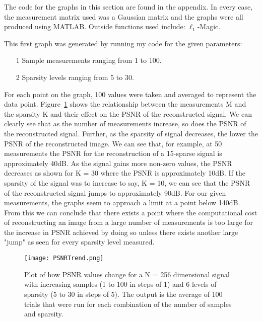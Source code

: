 \documentclass[titlepage,oneside, 12pt]{book}
\theoremstyle{break}
\begin{document}
The code for the graphs in this section are found in the appendix. In every case, the measurement matrix used was a Gaussian matrix and the graphs were all produced using MATLAB. Outside functions used include: $\ell_1$-Magic\cite{L1Magic}. 

This first graph was generated by running my code for the given parameters:

\begin{itemize}
\item[1] Sample measurements ranging from 1 to 100.
\item[2] Sparsity levels ranging from 5 to 30. 
\end{itemize}

For each point on the graph, 100 values were taken and averaged to represent the data point. Figure~\ref{fig:1DSNR} shows the relationship between the measurements M and the sparsity K and their effect on the PSNR of the reconstructed signal. We can clearly see that as the number of measurements increase, so does the PSNR of the reconstructed signal. Further, as the sparsity of signal decreases, the lower the PSNR of the reconstructed image. We can see that, for example, at 50 measurements the PSNR for the reconstruction of a 15-sparse signal is approximately 40dB. As the signal gains more non-zero values, the PSNR decreases as shown for K = 30 where the PSNR is approximately 10dB. If the sparsity of the signal was to increase to say, K = 10, we can see that the PSNR of the reconstructed signal jumps to approximately 90dB. For our given measurements, the graphs seem to approach a limit at a point below 140dB. From this we can conclude that there exists a point where the computational cost of reconstructing an image from a large number of measurements is too large for the increase in PSNR achieved by doing so unless there exists another large "jump" as seen for every sparsity level measured. 



\begin{figure}[H]
\centering
\centerline{\texttt{[image: PSNRTrend.png]}}
\caption{Plot of how PSNR values change for a N = 256 dimensional signal with increasing samples (1 to 100 in steps of 1) and 6 levels of sparsity (5 to 30 in steps of 5). The output is the average of 100 trials that were run for each combination of the number of samples and sparsity.}
\label{fig:1DSNR}
\end{figure}
\end{document}
